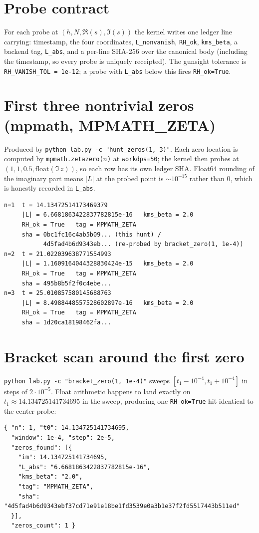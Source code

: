 \documentclass[11pt]{article}
\begin{document}
\section*{Probe contract}
For each probe at $(h, N, \Re(s), \Im(s))$ the kernel writes one
ledger line carrying: timestamp, the four coordinates,
\verb|L_nonvanish|, \verb|RH_ok|, \verb|kms_beta|, a backend tag,
\verb|L_abs|, and a per-line SHA-256 over the canonical body
(including the timestamp, so every probe is uniquely receipted).
The gunsight tolerance is \verb|RH_VANISH_TOL = 1e-12|; a probe with
\verb|L_abs| below this fires \verb|RH_ok=True|.

\section*{First three nontrivial zeros (mpmath, MPMATH\_ZETA)}
Produced by \texttt{python lab.py -c "hunt\_zeros(1, 3)"}. Each zero
location is computed by \texttt{mpmath.zetazero($n$)} at
\texttt{workdps=50}; the kernel then probes at
$(1, 1, 0.5, \mathrm{float}(\Im\,z))$, so each row has its own ledger
SHA. Float64 rounding of the imaginary part means $|L|$ at the
probed point is $\sim 10^{-15}$ rather than $0$, which is honestly
recorded in \verb|L_abs|.
\begin{lstlisting}
n=1  t = 14.13472514173469379
     |L| = 6.6681863422837782815e-16   kms_beta = 2.0
     RH_ok = True   tag = MPMATH_ZETA
     sha = 0bc1fc16c4ab5b09... (this hunt) /
           4d5fad4b6d9343eb... (re-probed by bracket_zero(1, 1e-4))
n=2  t = 21.022039638771554993
     |L| = 1.1609164044328830424e-15   kms_beta = 2.0
     RH_ok = True   tag = MPMATH_ZETA
     sha = 495b8b5f2f0c4ebe...
n=3  t = 25.010857580145688763
     |L| = 8.4988448557528602897e-16   kms_beta = 2.0
     RH_ok = True   tag = MPMATH_ZETA
     sha = 1d20ca18198462fa...
\end{lstlisting}

\section*{Bracket scan around the first zero}
\texttt{python lab.py -c "bracket\_zero(1, 1e-4)"} sweeps
$[t_1-10^{-4}, t_1+10^{-4}]$ in steps of $2\cdot 10^{-5}$. Float
arithmetic happens to land exactly on $t_1 \approx 14.134725141734695$
in the sweep, producing one \verb|RH_ok=True| hit identical to the
center probe:
\begin{lstlisting}
{ "n": 1, "t0": 14.134725141734695,
  "window": 1e-4, "step": 2e-5,
  "zeros_found": [{
    "im": 14.134725141734695,
    "L_abs": "6.6681863422837782815e-16",
    "kms_beta": "2.0",
    "tag": "MPMATH_ZETA",
    "sha": "4d5fad4b6d9343ebf37cd71e91e18be1fd3539e0a3b1e37f2fd5517443b511ed"
  }],
  "zeros_count": 1 }
\end{lstlisting}
\end{document}
